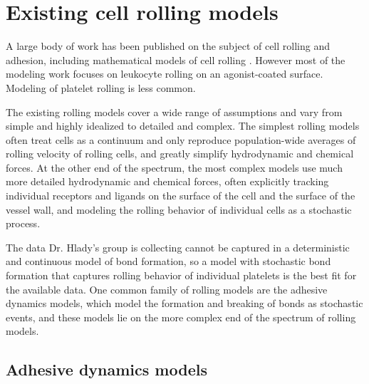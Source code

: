 \section{Existing cell rolling models}
\label{sec:exist-cell-roll}

A large body of work has been published on the subject of cell rolling
and adhesion, including mathematical models of cell rolling
\cite{Pospieszalska2009,Sundd2011}. However most of the modeling work
focuses on leukocyte rolling on an agonist-coated surface. Modeling of
platelet rolling is less common.

The existing rolling models cover a wide range of assumptions and vary
from simple and highly idealized to detailed and complex. The simplest
rolling models often treat cells as a continuum and only reproduce
population-wide averages of rolling velocity of rolling cells, and
greatly simplify hydrodynamic and chemical forces. At the other end of
the spectrum, the most complex models use much more detailed
hydrodynamic and chemical forces, often explicitly tracking individual
receptors and ligands on the surface of the cell and the surface of
the vessel wall, and modeling the rolling behavior of individual cells
as a stochastic process. 

The data Dr. Hlady's group is collecting cannot be captured in a
deterministic and continuous model of bond formation, so a model with
stochastic bond formation that captures rolling behavior of individual
platelets is the best fit for the available data. One common family of
rolling models are the adhesive dynamics models, which model the
formation and breaking of bonds as stochastic events, and these models
lie on the more complex end of the spectrum of rolling models.

\subsection{Adhesive dynamics models}
\label{sec:adhesive-dynamics}

